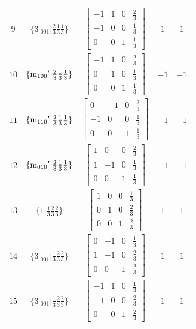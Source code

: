 \documentclass[fleqn,8pt]{jsarticle}
\begin{document}
\begin{longtable}{ccccc}
$ 9 $ & $ \{3^{-}_{\,\,001}|\frac{2}{3} \frac{1}{3} \frac{1}{3}\} $ & $ \begin{bmatrix} -1 & 1 & 0 & \frac{2}{3} \\ -1 & 0 & 0 & \frac{1}{3} \\ 0 & 0 & 1 & \frac{1}{3} \end{bmatrix} $ & $ 1 $ & $ 1 $ \\ \hline
$ 10 $ & $ \{{\rm m}_{100}{}'|\frac{2}{3} \frac{1}{3} \frac{1}{3}\} $ & $ \begin{bmatrix} -1 & 1 & 0 & \frac{2}{3} \\ 0 & 1 & 0 & \frac{1}{3} \\ 0 & 0 & 1 & \frac{1}{3} \end{bmatrix} $ & $ -1 $ & $ -1 $ \\ \hline
$ 11 $ & $ \{{\rm m}_{110}{}'|\frac{2}{3} \frac{1}{3} \frac{1}{3}\} $ & $ \begin{bmatrix} 0 & -1 & 0 & \frac{2}{3} \\ -1 & 0 & 0 & \frac{1}{3} \\ 0 & 0 & 1 & \frac{1}{3} \end{bmatrix} $ & $ -1 $ & $ -1 $ \\ \hline
$ 12 $ & $ \{{\rm m}_{010}{}'|\frac{2}{3} \frac{1}{3} \frac{1}{3}\} $ & $ \begin{bmatrix} 1 & 0 & 0 & \frac{2}{3} \\ 1 & -1 & 0 & \frac{1}{3} \\ 0 & 0 & 1 & \frac{1}{3} \end{bmatrix} $ & $ -1 $ & $ -1 $ \\ \hline
$ 13 $ & $ \{1|\frac{1}{3} \frac{2}{3} \frac{2}{3}\} $ & $ \begin{bmatrix} 1 & 0 & 0 & \frac{1}{3} \\ 0 & 1 & 0 & \frac{2}{3} \\ 0 & 0 & 1 & \frac{2}{3} \end{bmatrix} $ & $ 1 $ & $ 1 $ \\ \hline
$ 14 $ & $ \{3^{+}_{\,\,001}|\frac{1}{3} \frac{2}{3} \frac{2}{3}\} $ & $ \begin{bmatrix} 0 & -1 & 0 & \frac{1}{3} \\ 1 & -1 & 0 & \frac{2}{3} \\ 0 & 0 & 1 & \frac{2}{3} \end{bmatrix} $ & $ 1 $ & $ 1 $ \\ \hline
$ 15 $ & $ \{3^{-}_{\,\,001}|\frac{1}{3} \frac{2}{3} \frac{2}{3}\} $ & $ \begin{bmatrix} -1 & 1 & 0 & \frac{1}{3} \\ -1 & 0 & 0 & \frac{2}{3} \\ 0 & 0 & 1 & \frac{2}{3} \end{bmatrix} $ & $ 1 $ & $ 1 $ \\ \hline

\end{longtable}
\end{document}

